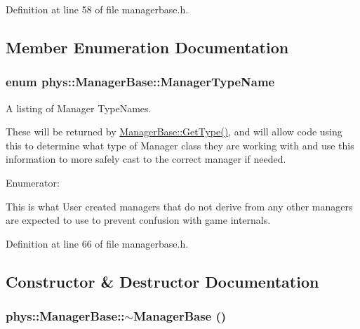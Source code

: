 Definition at line 58 of file managerbase.h.



\subsection{Member Enumeration Documentation}
\hypertarget{classphys_1_1ManagerBase_aaa6ccddf23892eaccb898529414f80a5}{
\subsubsection[{ManagerTypeName}]{\setlength{\rightskip}{0pt plus 5cm}enum {\bf phys::ManagerBase::ManagerTypeName}}}
\label{d2/de3/classphys_1_1ManagerBase_aaa6ccddf23892eaccb898529414f80a5}


A listing of Manager TypeNames. 

These will be returned by \hyperlink{classphys_1_1ManagerBase_aff400b6599db635e24796d8221e9a0e3}{ManagerBase::GetType()}, and will allow code using this to determine what type of Manager class they are working with and use this information to more safely cast to the correct manager if needed. \begin{Desc}
\item[Enumerator: ]\par
\begin{description}
\item[{\em 
\hypertarget{classphys_1_1ManagerBase_aaa6ccddf23892eaccb898529414f80a5a3239296e554feede76c4bcb6f824c66c}{
UserCreated}
\label{d2/de3/classphys_1_1ManagerBase_aaa6ccddf23892eaccb898529414f80a5a3239296e554feede76c4bcb6f824c66c}
}]This is what User created managers that do not derive from any other managers are expected to use to prevent confusion with game internals. \end{description}
\end{Desc}



Definition at line 66 of file managerbase.h.



\subsection{Constructor \& Destructor Documentation}
\hypertarget{classphys_1_1ManagerBase_a802dace8381459637297e9a372bfdf0c}{
\subsubsection[{$\sim$ManagerBase}]{\setlength{\rightskip}{0pt plus 5cm}phys::ManagerBase::$\sim$ManagerBase ()}}
\label{d2/de3/classphys_1_1ManagerBase_a802dace8381459637297e9a372bfdf0c}


